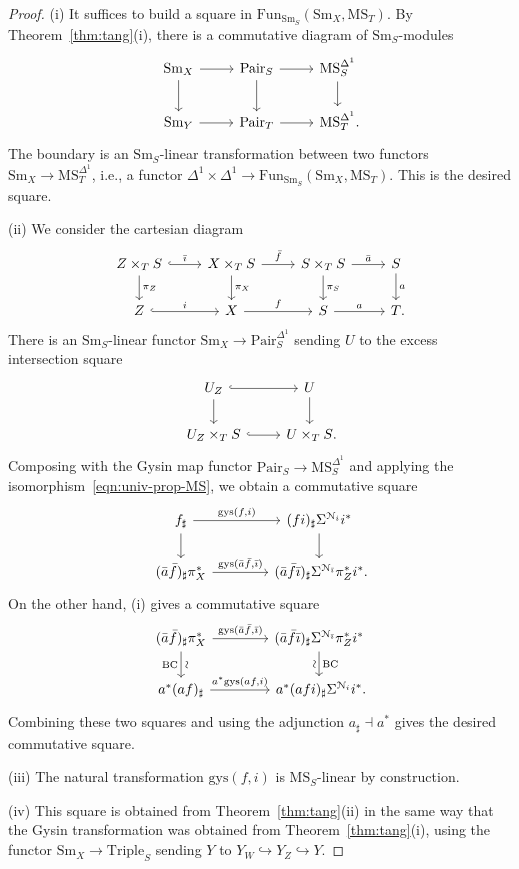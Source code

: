 \documentclass{amsart}
\numberwithin{equation}{section}
\theoremstyle{plain}
\theoremstyle{definition}
\let\scr=\mathcal
\let\into=\hookrightarrow
\let\cat=\mathrm
\def\Sm{{\cat{S}\mathrm{m}}}
\def\Pair{\mathrm{Pair}}
\def\MS{\mathrm{MS}}
\def\Fun{\mathrm{Fun}}
\def\gys{\mathrm{gys}{}}
\begin{document}
\begin{proof}
	(i) It suffices to build a square in $\Fun_{\Sm_S}(\Sm_X,\MS_T)$. By Theorem~\ref{thm:tang}(i), there is a commutative diagram of $\Sm_S$-modules
	\[
	\begin{tikzcd}
		\Sm_X \ar{r} \ar{d} & \Pair_S \ar{d} \ar{r} & \MS_S^{\Delta^1} \ar{d} \\
		\Sm_Y \ar{r} & \Pair_T \ar{r} & \MS_T^{\Delta^1}\rlap.
	\end{tikzcd}
	\]
	The boundary is an $\Sm_S$-linear transformation between two functors $\Sm_X\to\MS_T^{\Delta^1}$, i.e., a functor $\Delta^1\times\Delta^1\to\Fun_{\Sm_S}(\Sm_X,\MS_T)$. This is the desired square.
	
	(ii) We consider the cartesian diagram
	\[
	\begin{tikzcd}
		Z\times_TS \ar[hook]{r}{\bar\imath} \ar{d}{\pi_Z} & X\times_TS \ar{r}{\bar f} \ar{d}{\pi_X} & S\times_TS \ar{r}{\bar a} \ar{d}{\pi_S} & S \ar{d}{a} \\
		Z \ar[hook]{r}{i} & X \ar{r}{f} & S \ar{r}{a} & T\rlap.
	\end{tikzcd}
	\]
	There is an $\Sm_S$-linear functor $\Sm_X\to\Pair_S^{\Delta^1}$ sending $U$ to the excess intersection square
	\[
	\begin{tikzcd}
		U_Z \ar[hook]{r} \ar{d} & U \ar{d} \\
		U_Z\times_TS \ar[hook]{r} & U\times_TS\rlap.
	\end{tikzcd}
	\]
	Composing with the Gysin map functor $\Pair_S\to \MS_S^{\Delta^1}$ and applying the isomorphism~\eqref{eqn:univ-prop-MS}, we obtain a commutative square
	\[
	\begin{tikzcd}[column sep=4em]
		f_\sharp \ar{r}{\gys(f,i)} \ar{d} & (fi)_\sharp\Sigma^{\scr N_i} i^* \ar{d} \\
		(\bar a\bar f)_\sharp \pi_X^* \ar{r}{\gys(\bar a\bar f,\bar\imath)} & (\bar a\bar f\bar\imath)_\sharp\Sigma^{\scr N_{\bar\imath}}\pi_Z^*i^*\rlap.
	\end{tikzcd}
	\]
	On the other hand, (i) gives a commutative square
	\[
	\begin{tikzcd}[column sep=4em]
		(\bar a\bar f)_\sharp \pi_X^* \ar{r}{\mathrm{gys}(\bar a\bar f,\bar\imath)} \ar{d}[sloped]{\sim}[swap]{\mathrm{BC}} & (\bar a\bar f\bar\imath)_\sharp\Sigma^{\scr N_{\bar\imath}}\pi_Z^*i^* \ar{d}{\mathrm{BC}}[swap,sloped]{\sim} \\
		a^*(af)_\sharp \ar{r}{a^*\mathrm{gys}(af,i)} & a^*(afi)_\sharp\Sigma^{\scr N_i}i^*\rlap.
	\end{tikzcd}
	\]
	Combining these two squares and using the adjunction $a_\sharp\dashv a^*$ gives the desired commutative square.
	
	(iii) The natural transformation $\gys(f,i)$ is $\MS_S$-linear by construction.
	
	(iv) This square is obtained from Theorem~\ref{thm:tang}(ii) in the same way that the Gysin transformation was obtained from Theorem~\ref{thm:tang}(i), using the functor $\Sm_X\to\mathrm{Triple}_S$ sending $Y$ to $Y_W\into Y_Z\into Y$.
\end{proof}
\end{document}

